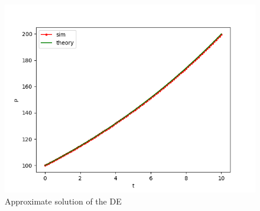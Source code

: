 \documentclass[journal]{IEEEtran}
\numberwithin{equation}{enumi}
\numberwithin{figure}{enumi}
\begin{document}
\begin{figure}[H]
   \centering
   \includegraphics[width=0.7\columnwidth]{figs/fig.png}
    \caption{Approximate solution of the DE}
\end{figure}
\end{document}
